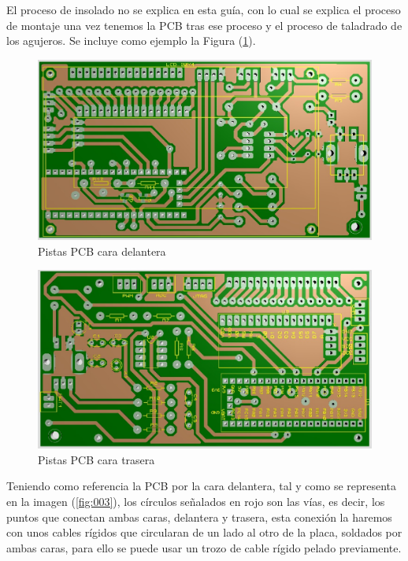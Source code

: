 \documentclass[10pt,a4paper,oneside]{article}
\begin{document}
El proceso de insolado no se explica en esta guía, con lo cual se explica el proceso de montaje una vez tenemos la PCB tras ese proceso y el proceso de taladrado de los agujeros. Se incluye como ejemplo la Figura (\ref{fig:001}).

\begin{figure}[H]
\centering
\includegraphics[scale=0.5]{Imagenes/PCB_CARA_DELANTERA.jpg}
\caption[Vista de las pistas de la cara delantera de la PCB tras el proceso de insolado]{Pistas PCB cara delantera}
\label{fig:001}
\end{figure}

\begin{figure}[H]
\centering
\includegraphics[scale=0.5]{Imagenes/PCB_CARA_TRASERA.jpg}
\caption[Vista de las pistas de la cara trasera de la PCB tras el proceso de insolado]{Pistas PCB cara trasera}
\label{fig:002}
\end{figure}

Teniendo como referencia la PCB por la cara delantera,  tal y como se representa en la imagen (\ref{fig:003}), los círculos señalados en rojo son las vías, es decir, los puntos que conectan ambas caras, delantera y trasera, esta conexión la haremos con unos cables rígidos que circularan de un lado al otro de la placa, soldados por ambas caras, para ello se puede usar un trozo de cable rígido pelado previamente. 
\end{document}
